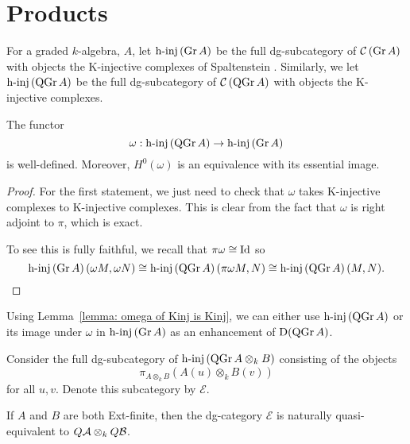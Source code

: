 \section{Products} \label{section: products}

\begin{definition}
  For a graded \(k\)-algebra, \(A\), let \(\operatorname{h-inj}\left(\operatorname{Gr}A\right)\) be the full dg-subcategory of \(\mathcal{C}\left(\operatorname{Gr}A\right)\) with objects the K-injective complexes of Spaltenstein \parencite{Spaltenstein88}. Similarly, we let \(\operatorname{h-inj}\left(\operatorname{QGr}A\right)\) be the full dg-subcategory of \(\mathcal{C}\left(\operatorname{QGr}A\right)\) with objects the K-injective complexes.
\end{definition}

\begin{lemma} \label{lemma: omega of Kinj is Kinj}
  The functor 
  \begin{displaymath}
    \omega : \operatorname{h-inj}\left(\operatorname{QGr}A\right) \to \operatorname{h-inj}\left(\operatorname{Gr}A\right)
  \end{displaymath}
  is well-defined. Moreover, \(H^0(\omega)\) is an equivalence with its essential image. 
\end{lemma}

\begin{proof}
  For the first statement, we just need to check that \(\omega\) takes K-injective complexes to K-injective complexes. 
  This is clear from the fact that \(\omega\) is right adjoint to \(\pi\), which is exact.
  
  To see this is fully faithful, we recall that \(\pi \omega \cong \operatorname{Id}\) so
  \[\operatorname{h-inj}\left(\operatorname{Gr}A\right)(\omega M, \omega N) \cong \operatorname{h-inj}\left(\operatorname{QGr}A\right)(\pi\omega M, N) \cong \operatorname{h-inj}\left(\operatorname{QGr}A\right)(M,N).\]
\end{proof}

\begin{remark} \label{remark: enhancement of DQGr}
  Using Lemma~\ref{lemma: omega of Kinj is Kinj}, we can either use \(\operatorname{h-inj}\left(\operatorname{QGr}A\right)\) or its image under \(\omega\) in \(\operatorname{h-inj}\left(\operatorname{Gr}A\right)\) as an enhancement of \(\mathrm{D}(\operatorname{QGr}A)\). 
\end{remark}

Consider the full dg-subcategory of \(\operatorname{h-inj}\left(\operatorname{QGr}A \otimes_k B\right)\) consisting of the objects
\[\pi_{A \otimes_k B} (A(u) \otimes_k B(v))\]
for all \(u,v\). Denote this subcategory by \(\mathcal E\).

\begin{lemma} \label{lemma: another model for QA otimes QB}
  If \(A\) and \(B\) are both Ext-finite, then the dg-category \(\mathcal E\) is naturally quasi-equivalent to \(Q \mathcal{A} \otimes_k Q \mathcal{B}\).
\end{lemma}

